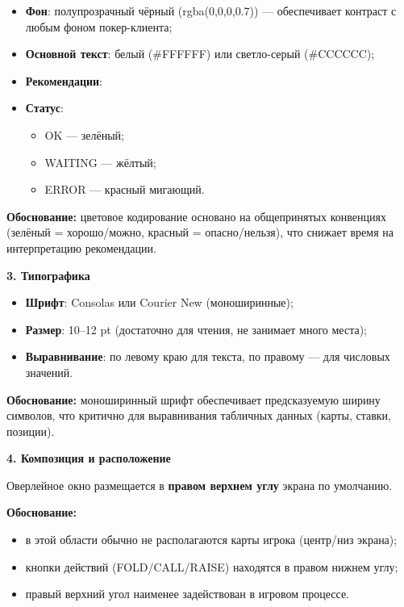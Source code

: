 \begin{itemize}
    \item \textbf{Фон}: полупрозрачный чёрный (rgba(0,0,0,0.7)) --- обеспечивает контраст с любым фоном покер-клиента;
    \item \textbf{Основной текст}: белый (#FFFFFF) или светло-серый (#CCCCCC);
    \item \textbf{Рекомендации}:
    \item \textbf{Статус}:
    \begin{itemize}
        \item OK --- зелёный;
        \item WAITING --- жёлтый;
        \item ERROR --- красный мигающий.
    \end{itemize}
\end{itemize}

\textbf{Обоснование:} цветовое кодирование основано на общепринятых конвенциях (зелёный = хорошо/можно, красный = опасно/нельзя), что снижает время на интерпретацию рекомендации.

\textbf{3. Типографика}

\begin{itemize}
    \item \textbf{Шрифт}: Consolas или Courier New (моноширинные);
    \item \textbf{Размер}: 10--12 pt (достаточно для чтения, не занимает много места);
    \item \textbf{Выравнивание}: по левому краю для текста, по правому --- для числовых значений.
\end{itemize}

\textbf{Обоснование:} моноширинный шрифт обеспечивает предсказуемую ширину символов, что критично для выравнивания табличных данных (карты, ставки, позиции).

\textbf{4. Композиция и расположение}

Оверлейное окно размещается в \textbf{правом верхнем углу} экрана по умолчанию.

\textbf{Обоснование:}
\begin{itemize}
    \item в этой области обычно не располагаются карты игрока (центр/низ экрана);
    \item кнопки действий (FOLD/CALL/RAISE) находятся в правом нижнем углу;
    \item правый верхний угол наименее задействован в игровом процессе.
\end{itemize}

